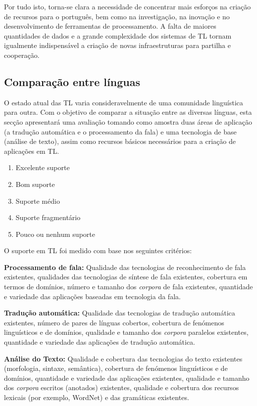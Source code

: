 \documentclass[]{../metanetpaper}
\begin{document}
\begin{multicols}{2}
Por tudo isto, torna-se clara a necessidade de concentrar mais esforços na criação de recursos para o português, bem como na investigação, na inovação e no desenvolvimento de ferramentas de processamento. A falta de maiores quantidades de dados e a grande complexidade dos sistemas de TL tornam igualmente indispensável a criação de novas infraestruturas para partilha e cooperação.

\subsection{Comparação entre línguas}

 O estado atual das TL varia consideravelmente de uma comunidade linguística para outra. Com o objetivo de comparar a situação entre as diversas línguas, esta secção apresentará uma avaliação tomando como amostra duas áreas de aplicação (a tradução automática e o processamento da fala) e uma tecnologia de base (análise de texto), assim como recursos básicos necessários para a criação de aplicações em TL.

\begin{enumerate}
\item Excelente suporte 
\item Bom suporte 
\item Suporte médio
\item Suporte fragmentário
\item Pouco ou nenhum suporte
\end{enumerate}

O suporte em TL foi medido com base nos seguintes critérios:

\textbf{Processamento de fala:} Qualidade das tecnologias de reconhecimento de fala existentes, qualidades das tecnologias de síntese de fala existentes, cobertura em termos de domínios, número e tamanho dos \textit{corpora} de fala existentes, quantidade e variedade das aplicações baseadas em tecnologia da fala.

\textbf{Tradução automática:} Qualidade das tecnologias de tradução automática existentes, número de pares de línguas cobertos, cobertura de fenómenos linguísticos e de domínios, qualidade e tamanho dos \textit{corpora} paralelos existentes, quantidade e variedade das aplicações de tradução automática.

\textbf{Análise do Texto:} Qualidade e cobertura das tecnologias do texto existentes (morfologia, sintaxe, semântica), cobertura de fenómenos linguísticos e de domínios, quantidade e variedade das aplicações existentes, qualidade e tamanho dos \textit{corpora} escritos (anotados) existentes, qualidade e cobertura dos recursos lexicais (por exemplo, WordNet) e das gramáticas e\-xis\-ten\-tes.


\end{multicols}
\end{document}

